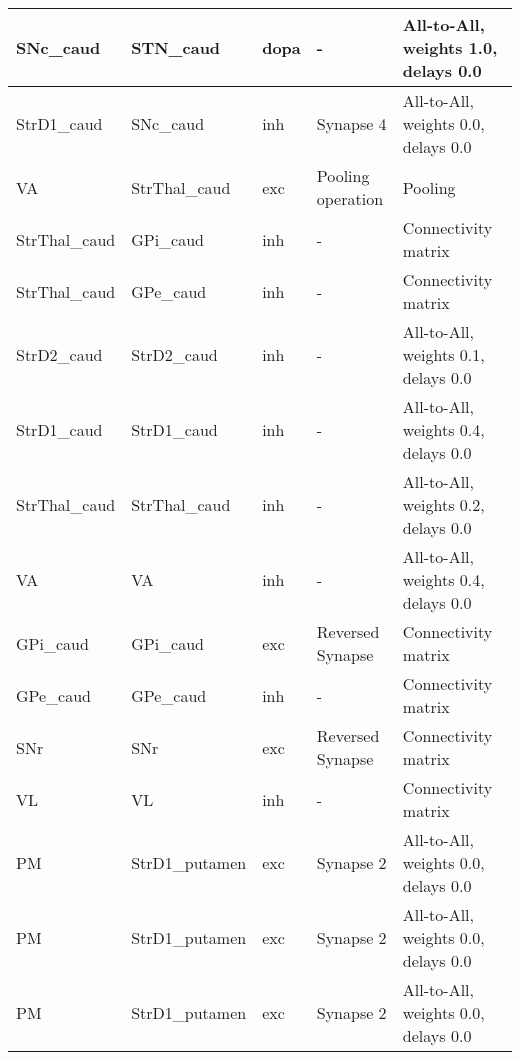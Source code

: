 \documentclass{article}
\begin{document}
\begin{tabularx}{\linewidth}{|l|l|l|X|X|}
    SNc\_caud & STN\_caud & dopa & - &
    All-to-All, weights 1.0, delays 0.0 \\ \hline

    StrD1\_caud & SNc\_caud & inh & Synapse 4 &
    All-to-All, weights 0.0, delays 0.0 \\ \hline

    VA & StrThal\_caud & exc & Pooling operation &
    Pooling \\ \hline

    StrThal\_caud & GPi\_caud & inh & - &
    Connectivity matrix \\ \hline

    StrThal\_caud & GPe\_caud & inh & - &
    Connectivity matrix \\ \hline

    StrD2\_caud & StrD2\_caud & inh & - &
    All-to-All, weights 0.1, delays 0.0 \\ \hline

    StrD1\_caud & StrD1\_caud & inh & - &
    All-to-All, weights 0.4, delays 0.0 \\ \hline

    StrThal\_caud & StrThal\_caud & inh & - &
    All-to-All, weights 0.2, delays 0.0 \\ \hline

    VA & VA & inh & - &
    All-to-All, weights 0.4, delays 0.0 \\ \hline

    GPi\_caud & GPi\_caud & exc & Reversed Synapse &
    Connectivity matrix \\ \hline

    GPe\_caud & GPe\_caud & inh & - &
    Connectivity matrix \\ \hline

    SNr & SNr & exc & Reversed Synapse &
    Connectivity matrix \\ \hline

    VL & VL & inh & - &
    Connectivity matrix \\ \hline

    PM & StrD1\_putamen & exc & Synapse 2 &
    All-to-All, weights 0.0, delays 0.0 \\ \hline

    PM & StrD1\_putamen & exc & Synapse 2 &
    All-to-All, weights 0.0, delays 0.0 \\ \hline

    PM & StrD1\_putamen & exc & Synapse 2 &
    All-to-All, weights 0.0, delays 0.0 \\ \hline


\end{tabularx}
\end{document}
